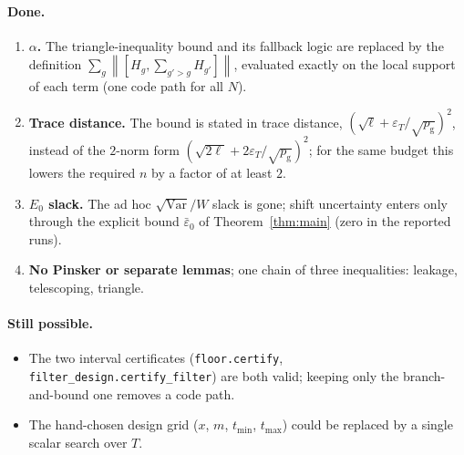 \documentclass[11pt]{article}
\theoremstyle{definition}
\newcommand{\norm}[1]{\left\lVert #1\right\rVert}
\newcommand{\eps}{\varepsilon}
\newcommand{\pg}{p_{\mathrm g}}
\newcommand{\code}[1]{\texttt{#1}}
\begin{document}
\paragraph{Done.}
\begin{enumerate}[leftmargin=*]
\item \textbf{$\alpha$.} The triangle-inequality bound and its fallback logic are replaced by the definition
      $\sum_g\norm{[H_g,\sum_{g'>g}H_{g'}]}$, evaluated exactly on the local support of each term (one code path for all $N$).
\item \textbf{Trace distance.} The bound is stated in trace distance, $(\sqrt\ell+\eps_T/\sqrt{\pg})^2$, instead of the
      $2$-norm form $(\sqrt{2\ell}+2\eps_T/\sqrt{\pg})^2$; for the same budget this lowers the required $n$ by a factor of at least $2$.
\item \textbf{$E_0$ slack.} The ad hoc $\sqrt{\mathrm{Var}}/W$ slack is gone; shift uncertainty enters only through the explicit bound $\bar\varepsilon_0$ of Theorem~\ref{thm:main} (zero in the reported runs).
\item \textbf{No Pinsker or separate lemmas}; one chain of three inequalities: leakage, telescoping, triangle.
\end{enumerate}
\paragraph{Still possible.}
\begin{itemize}[leftmargin=*]
\item The two interval certificates (\code{floor.certify}, \code{filter\_design.certify\_filter}) are both valid; keeping only
      the branch-and-bound one removes a code path.
\item The hand-chosen design grid ($x$, $m$, $t_{\min}$, $t_{\max}$) could be replaced by a single scalar search over $T$.
\end{itemize}
\end{document}
